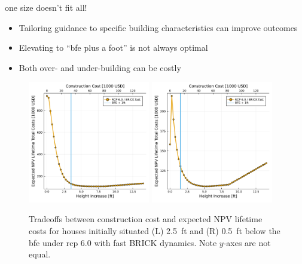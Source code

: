 \begin{block}{one size doesn't fit all!}
    \begin{itemize}
        \item Tailoring guidance to specific building characteristics can improve outcomes
        \item Elevating to ``\gls{bfe} plus a foot'' is not always optimal \cite{xian_elevation:2017,zarekarizi_suboptimal:2020}
        \item Both over- and under-building can be costly \cite{ansar_bigisfragile:2017,DossGollin:2019}
    \end{itemize}
    \begin{framed}
        \begin{figure}
            \centering
            \includegraphics[width=0.475\textwidth]{5.5.pdf}%
            \includegraphics[width=0.475\textwidth]{7.5.pdf}
            \caption{
                Tradeoffs between construction cost and expected NPV lifetime costs for houses initially situated (L) \SI{2.5}{ft} and (R) \SI{0.5}{ft} below the \gls{bfe} under \gls{rcp} 6.0 with fast BRICK dynamics.
                Note $y$-axes are not equal.
            }
        \end{figure}
    \end{framed}
\end{block}